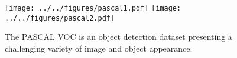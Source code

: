 \begin{figure}[ht]
\centering
\texttt{[image: ../../figures/pascal1.pdf]}
\texttt{[image: ../../figures/pascal2.pdf]}
\caption{
The PASCAL VOC is an object detection dataset presenting a challenging variety of image and object appearance.
}\label{fig:pascal}
\end{figure}
